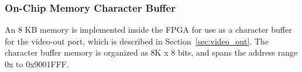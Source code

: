 \subsubsection{On-Chip Memory Character Buffer}
An 8 KB memory is implemented inside the FPGA for use as a character buffer for the video-out
port, which is described in Section~\ref{sec:video_out}.
The character buffer memory is organized as 8K {\sf x} 8 bits, and spans the {\processor}
address range {\sf 0x} to {\sf 0x\baseAddressOffset 9001FFF}.

